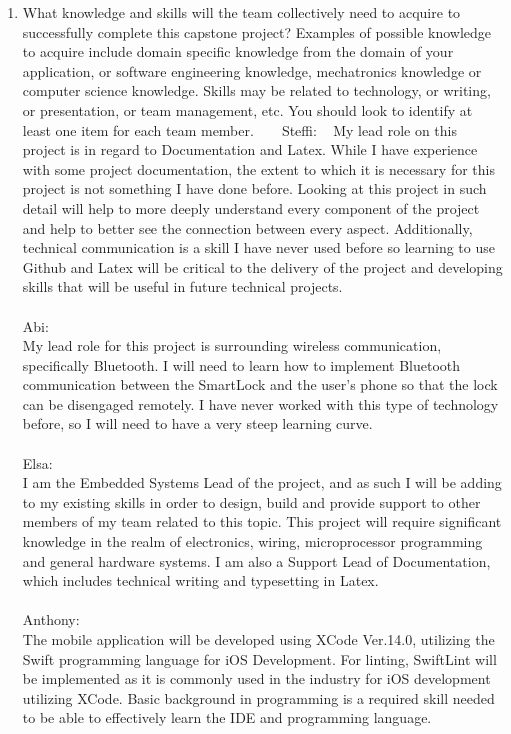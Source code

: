 \documentclass[12pt]{article}
\begin{document}
\begin{enumerate}
  \item What knowledge and skills will the team collectively need to acquire to
  successfully complete this capstone project?  Examples of possible knowledge
  to acquire include domain specific knowledge from the domain of your
  application, or software engineering knowledge, mechatronics knowledge or
  computer science knowledge.  Skills may be related to technology, or writing,
  or presentation, or team management, etc.  You should look to identify at
  least one item for each team member.
  ~\newline
  ~\newline
 Steffi: 
  ~\newline
My lead role on this project is in regard to Documentation and Latex.  While I have experience with some project documentation, the extent to which it is necessary for this project is not something I have done before.  Looking at this project in such detail will help to more deeply understand every component of the project and help to better see the connection between every aspect.  Additionally, technical communication is a skill I have never used before so learning to use Github and Latex will be critical to the delivery of the project and developing skills that will be useful in future technical projects.
\\
\\
Abi:
\\
My lead role for this project is surrounding wireless communication, specifically Bluetooth.  I will need to learn how to implement Bluetooth communication between the SmartLock and the user's phone so that the lock can be disengaged remotely.  I have never worked with this type of technology before, so I will need to have a very steep learning curve. 
 \\
\\
Elsa:
\\ 
 I am the Embedded Systems Lead of the project, and as such I will be adding to my existing skills in order to design, build and provide support to other members of my team related to this topic.  This project will require significant knowledge in the realm of electronics, wiring, microprocessor programming and general hardware systems.  I am also a Support Lead of Documentation, which includes technical writing and typesetting in Latex. 
\\
\\
Anthony:
\\ 
The mobile application will be developed using XCode Ver.14.0, utilizing the Swift programming language for iOS Development. For linting, SwiftLint will be implemented as it is commonly used in the industry for iOS development utilizing XCode. Basic background in programming is a required skill needed to be able to effectively learn the IDE and programming language.

\end{enumerate}
\end{document}
